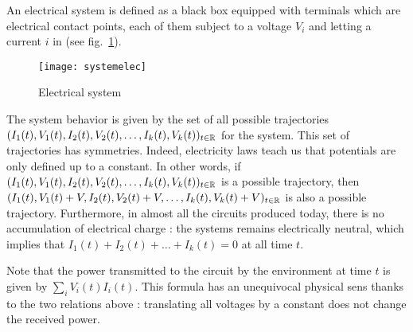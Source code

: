 An electrical system is defined as a black box equipped with terminals which are electrical contact points, each of them subject to a voltage $V_i$ and letting a current $i$ in (see fig.~\ref{fig:systemelec}).
\begin{figure}[t]
\begin{center}
\texttt{[image: systemelec]}
\caption{Electrical system}
\label{fig:systemelec}
\end{center}
\end{figure}

The system behavior is given by the set of all possible trajectories\\
$(I_1(t), V_1(t), I_2(t), V_2(t), \ldots, I_k(t),V_k(t))_{t \in \mathbb{R}}$ for the system. This set of trajectories has symmetries. Indeed, electricity laws teach us that potentials are only defined up to a constant. In other words, if\\ $(I_1(t), V_1(t), I_2(t), V_2(t), \ldots, I_k(t), V_k(t))_{t \in \mathbb{R}}$ is a possible trajectory, then \\$(I_1(t), V_1(t)+V, I_2(t), V_2(t)+V, \ldots, I_k(t), V_k(t)+V)_{t \in \mathbb{R}}$ is also a possible trajectory. Furthermore, in almost all the circuits produced today, there is no accumulation of electrical charge : the systems remains electrically neutral, which implies that $I_1(t) + I_2(t) + \ldots + I_k(t)=0$ at all time $t$.

Note that the power transmitted to the circuit by the environment at time $t$ is given by $\sum_i V_i(t) I_i(t)$. This formula has an unequivocal physical sens thanks to the two relations above : translating all voltages by a constant does not change the received power.


